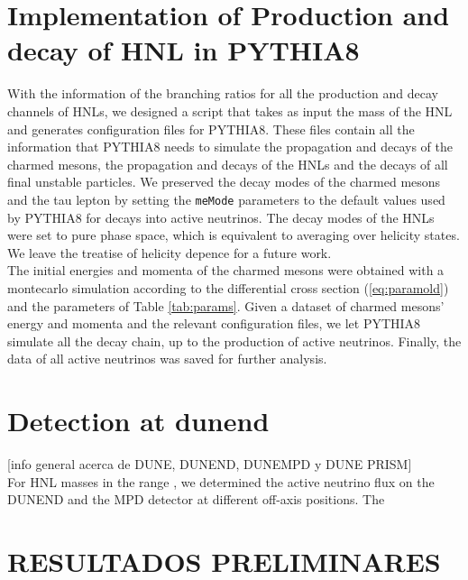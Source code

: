 \documentclass[aps,prd,twocolumn,superscriptaddress,amsmath,amssymb]{revtex4}
\def\code#1{\texttt{#1}}
\begin{document}
\section{Implementation of Production and decay of HNL in PYTHIA8}
With the information of the branching ratios for all the production and decay channels of HNLs, we designed a script that takes as input the mass of the HNL and generates configuration files for PYTHIA8. These files contain all the information that PYTHIA8 needs to simulate the propagation and decays of the charmed mesons, the propagation and decays of the HNLs and the decays of all final unstable particles. We preserved the decay modes of the charmed mesons and the tau lepton by setting the \code{meMode} parameters to the default values used by PYTHIA8 for decays into active neutrinos. The decay modes of the HNLs were set to pure phase space, which is equivalent to averaging over helicity states. We leave the treatise of helicity depence for a future work.\\

The initial energies and momenta of the charmed mesons were obtained with a montecarlo simulation according to the differential cross section (\ref{eq:paramold}) and the parameters of Table \ref{tab:params}. Given a dataset of charmed mesons' energy and momenta and the relevant configuration files, we let PYTHIA8 simulate all the decay chain, up to the production of active neutrinos. Finally, the data of all active neutrinos was saved for further analysis. 

\section{Detection at dunend}

[info general acerca de DUNE, DUNEND, DUNEMPD y DUNE PRISM]\\

For HNL masses in the range , we determined the active neutrino flux on the DUNEND and the MPD detector at different off-axis positions. The

\section{RESULTADOS PRELIMINARES}
\end{document}
